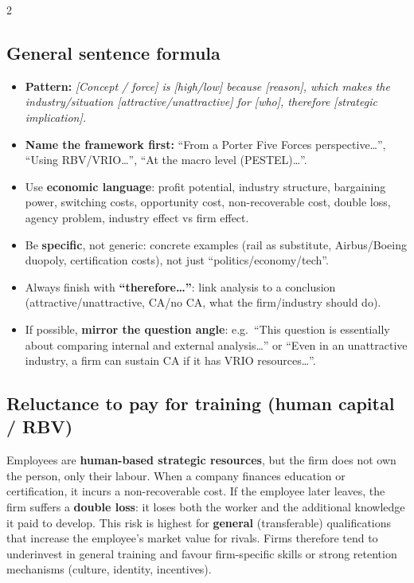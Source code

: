 \documentclass[8pt,landscape,a4paper]{article}
\newcommand{\hlpeach}[1]{\textcolor{eublue}{\textbf{#1}}}
\begin{document}
\begin{multicols}{2}
\subsection*{\hlpeach{General sentence formula}}
\begin{itemize}[leftmargin=*,nosep]
\item \textbf{Pattern:} \emph{[Concept / force] is [high/low] because [reason], which makes the industry/situation [attractive/unattractive] for [who], therefore [strategic implication].}
\item \textbf{Name the framework first:} ``From a Porter Five Forces perspective\ldots'', ``Using RBV/VRIO\ldots'', ``At the macro level (PESTEL)\ldots''.
\item Use \textbf{economic language}: profit potential, industry structure, bargaining power, switching costs, opportunity cost, non-recoverable cost, double loss, agency problem, industry effect vs firm effect.
\item Be \textbf{specific}, not generic: concrete examples (rail as substitute, Airbus/Boeing duopoly, certification costs), not just ``politics/economy/tech''.
\item Always finish with \textbf{``therefore\ldots''}: link analysis to a conclusion (attractive/unattractive, CA/no CA, what the firm/industry should do).
\item If possible, \textbf{mirror the question angle}: e.g.\ ``This question is essentially about comparing internal and external analysis\ldots'' or ``Even in an unattractive industry, a firm can sustain CA if it has VRIO resources\ldots''.
\end{itemize}

\subsection*{\hlpeach{Reluctance to pay for training (human capital / RBV)}}
Employees are \textbf{human-based strategic resources}, but the firm does not own the person, only their labour. When a company finances education or certification, it incurs a non-recoverable cost. If the employee later leaves, the firm suffers a \textbf{double loss}: it loses both the worker and the additional knowledge it paid to develop. This risk is highest for \textbf{general} (transferable) qualifications that increase the employee's market value for rivals. Firms therefore tend to underinvest in general training and favour firm-specific skills or strong retention mechanisms (culture, identity, incentives).


\end{multicols}
\end{document}
